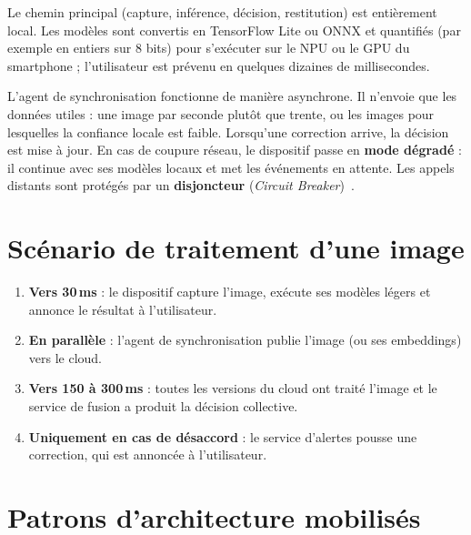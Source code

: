 \documentclass[11pt,a4paper]{report}
\begin{document}
Le chemin principal (capture, inférence, décision, restitution) est entièrement local. Les modèles sont convertis en TensorFlow Lite ou ONNX et quantifiés (par exemple en entiers sur 8 bits) pour s'exécuter sur le NPU ou le GPU du smartphone ; l'utilisateur est prévenu en quelques dizaines de millisecondes.

L'agent de synchronisation fonctionne de manière asynchrone. Il n'envoie que les données utiles : une image par seconde plutôt que trente, ou les images pour lesquelles la confiance locale est faible. Lorsqu'une correction arrive, la décision est mise à jour. En cas de coupure réseau, le dispositif passe en \textbf{mode dégradé} : il continue avec ses modèles locaux et met les événements en attente. Les appels distants sont protégés par un \textbf{disjoncteur} (\emph{Circuit Breaker})~\cite{nygard2018}.

\section{Scénario de traitement d'une image}

\begin{enumerate}
  \item \textbf{Vers 30\,ms} : le dispositif capture l'image, exécute ses modèles légers et annonce le résultat à l'utilisateur.
  \item \textbf{En parallèle} : l'agent de synchronisation publie l'image (ou ses embeddings) vers le cloud.
  \item \textbf{Vers 150 à 300\,ms} : toutes les versions du cloud ont traité l'image et le service de fusion a produit la décision collective.
  \item \textbf{Uniquement en cas de désaccord} : le service d'alertes pousse une correction, qui est annoncée à l'utilisateur.
\end{enumerate}

\section{Patrons d'architecture mobilisés}
\end{document}
